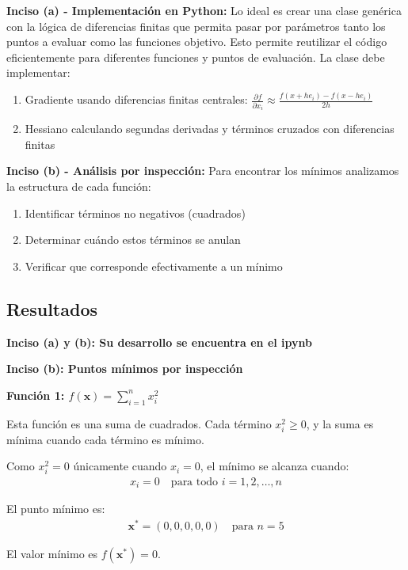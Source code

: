 \documentclass{article}
\begin{document}
\textbf{Inciso (a) - Implementación en Python:}
Lo ideal es crear una clase genérica con la lógica de diferencias finitas que permita pasar por parámetros tanto los puntos a evaluar como las funciones objetivo. Esto permite reutilizar el código eficientemente para diferentes funciones y puntos de evaluación. La clase debe implementar:
\begin{enumerate}
    \item Gradiente usando diferencias finitas centrales: $\frac{\partial f}{\partial x_i} \approx \frac{f(x + h e_i) - f(x - h e_i)}{2h}$
    \item Hessiano calculando segundas derivadas y términos cruzados con diferencias finitas
\end{enumerate}

\textbf{Inciso (b) - Análisis por inspección:}
Para encontrar los mínimos analizamos la estructura de cada función:
\begin{enumerate}
    \item Identificar términos no negativos (cuadrados)
    \item Determinar cuándo estos términos se anulan
    \item Verificar que corresponde efectivamente a un mínimo
\end{enumerate}

\subsection{Resultados}
\setcounter{equation}{0}

\textbf{Inciso (a) y (b): Su desarrollo se encuentra en el ipynb}

\textbf{Inciso (b): Puntos mínimos por inspección}

\textbf{Función 1: $f(\mathbf{x}) = \sum_{i=1}^{n} x_i^{2}$}

Esta función es una suma de cuadrados. Cada término $x_i^2 \geq 0$, y la suma es mínima cuando cada término es mínimo.

Como $x_i^2 = 0$ únicamente cuando $x_i = 0$, el mínimo se alcanza cuando:
\begin{align}
x_i = 0 \quad \text{para todo } i = 1, 2, \ldots, n
\end{align}

El punto mínimo es:
\begin{align}
\mathbf{x}^* = (0, 0, 0, 0, 0) \quad \text{para } n = 5
\end{align}

El valor mínimo es $f(\mathbf{x}^*) = 0$.
\end{document}
